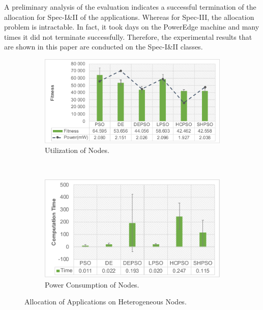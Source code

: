 A preliminary analysis of the evaluation indicates a successful termination of the allocation for Spec-I\&II of the applications. Whereas for Spec-III, the allocation problem is intractable. In fact, it took days on the PowerEdge machine and many times it did not terminate successfully. Therefore, the experimental results that are shown in this paper are conducted on the Spec-I\&II classes. 
\begin{figure}
    \centering
    \begin{subfigure}[b]{0.525  \textwidth}
        \includegraphics[width=\textwidth]{img/fitness_c20_g30_m10.pdf}
        \caption{Utilization of Nodes.}
        \label{fig_util}
    \end{subfigure}
    ~%
        \begin{subfigure}[b]{0.45\textwidth}
        \includegraphics[width=\textwidth]{img/time_c20_g30_m10.pdf}
        \caption{Power Consumption of Nodes.}
        \label{fig_power}
    \end{subfigure}
    \caption{Allocation of Applications on Heterogeneous Nodes.}
    \label{fig_util_power}\vspace{-0.2cm}
\end{figure}



